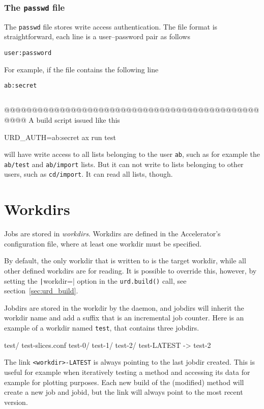 \subsubsection{The \texttt{passwd} file}
The \texttt{passwd} file stores write access authentication.  The file
format is straightforward, each line is a user--password pair as follows
\begin{verbatim}
user:password
\end{verbatim}
For example, if the file contains the following line
\begin{verbatim}
ab:secret
\end{verbatim}



\subsection{}
@@@@@@@@@@@@@@@@@@@@@@@@@@@@@@@@@@@@@@@@@@@@@@@@@@
A build script issued like this
\begin{shell}
URD_AUTH=ab:secret ax run test
\end{shell}
will have write access to all lists belonging to the user \texttt{ab},
such as for example the \texttt{ab/test} and \texttt{ab/import} lists.
But it can not write to lists belonging to other users, such
as \texttt{cd/import}.  It can read all lists, though.





\section{Workdirs}

Jobs are stored in \textsl{workdirs}.  Workdirs are defined in the
Accelerator's configuration file, where at least one workdir must be
specified.

By default, the only workdir that is written to is the target workdir,
while all other defined workdirs are for reading.  It is possible to
override this, however, by setting the \texttt|workdir=|
option in the \texttt{urd.build()} call, see
section~\ref{sec:urd_build}.

Jobdirs are stored in the workdir by the daemon, and jobdirs will
inherit the workdir name and add a suffix that is an incremental job
counter.  Here is an example of a workdir named \texttt{test}, that
contains three jobdirs.
\begin{shell}
test/
    test-slices.conf
    test-0/
    test-1/
    test-2/
    test-LATEST -> test-2
\end{shell}
The link \texttt{<workdir>-LATEST} is always pointing to the last
jobdir created.  This is useful for example when iteratively testing a
method and accessing its data for example for plotting purposes.  Each
new build of the (modified) method will create a new job and jobid,
but the link will always point to the most recent version.


